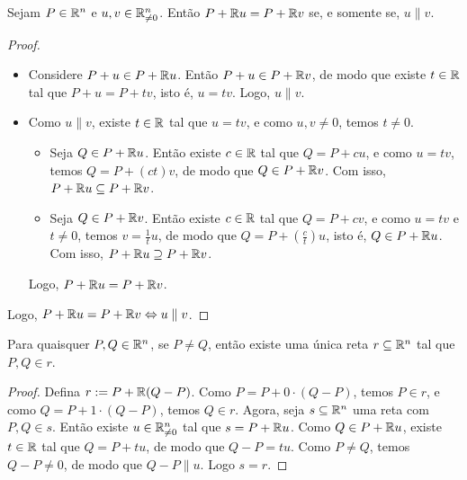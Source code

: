 \begin{proposition} 
    Sejam $P \in \mathbb{R}^n$ e $u,v \in \mathbb{R}^n_{\neq 0}$. Então $P + \mathbb{R} u = P + \mathbb{R} v$ se, e somente se, $u \parallel v$.
\end{proposition}

\begin{proof}
    \leavevmode
        \begin{itemize}[align=left]
            \item[($\Rightarrow$)] Considere $P + u \in P + \mathbb{R} u$. Então $P+u \in P + \mathbb{R} v$, de modo que existe $t \in \mathbb{R}$ tal que $P+u = P + tv$, isto é, $u=tv$. Logo, $u \parallel v$.
            \item[($\Leftarrow$)] Como $u \parallel v$, existe $t \in \mathbb{R}$ tal que $u = tv$, e como $u,v \neq 0$, temos $t \neq 0$. 
                \begin{itemize}
                    \item[($\subseteq$)] Seja $Q \in P + \mathbb{R} u$. Então existe $c \in  \mathbb{R}$ tal que $Q = P + c u$, e como $u = tv$, temos $Q = P + (ct)v$, de modo que $Q \in P + \mathbb{R} v$. Com isso, $P + \mathbb{R} u \subseteq P + \mathbb{R} v$.
                    \item[($\supseteq$)] Seja $Q \in P + \mathbb{R} v$. Então existe $c \in  \mathbb{R}$ tal que $Q = P + c v$, e como $u = tv$ e $t \neq 0$, temos $v = \frac{1}{t}u$, de modo que $Q = P + \left(\frac{c}{t}\right)u$, isto é, $Q \in P + \mathbb{R} u$. Com isso, $P + \mathbb{R} u \supseteq P + \mathbb{R} v$. 
                \end{itemize}
            Logo, $P + \mathbb{R} u = P + \mathbb{R} v$.
        \end{itemize}
    Logo, $P + \mathbb{R} u = P + \mathbb{R} v \Leftrightarrow u \parallel v$. \blackproof
\end{proof}

\begin{corollary} 
    Para quaisquer $P, Q \in \mathbb{R}^n$, se $P \neq Q$, então existe uma única reta $r \subseteq \mathbb{R}^n$ tal que $P,Q \in r$.
\end{corollary}

\begin{proof}
    Defina $r := P + \mathbb{R} (Q-P)$. Como $P = P + 0 \cdot (Q-P)$, temos $P \in r$, e como $Q = P + 1 \cdot (Q-P)$, temos $Q \in r$. Agora, seja $s \subseteq \mathbb{R}^n$ uma reta com $P, Q \in s$. Então existe $u \in \mathbb{R}^n_{\neq 0}$ tal que $s = P + \mathbb{R} u$. Como $Q \in P + \mathbb{R} u$, existe $t \in \mathbb{R}$ tal que $Q = P + t u$, de modo que $Q-P = t u$. Como $P \neq Q$, temos $Q - P \neq 0$, de modo que $Q-P \parallel u$. Logo $s = r$. \blackproof
\end{proof}


